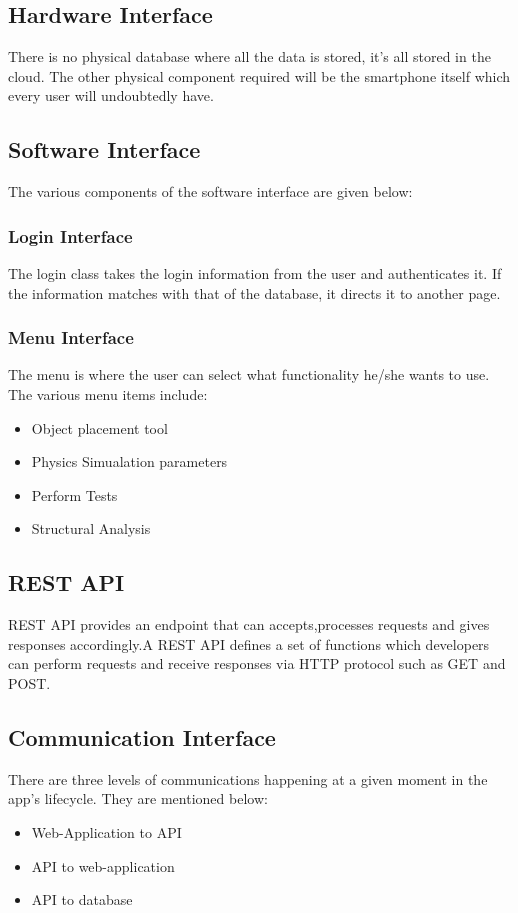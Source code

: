 \documentclass[BTech]{srmuthesis}
\begin{document}
\subsection{Hardware Interface}
There is no physical database where all the data is stored, it's all stored in the cloud. The other physical component required will be the smartphone itself which every user will undoubtedly have.
\subsection{Software Interface}
The various components of the software interface are given below:
\subsubsection{Login Interface}
The login class takes the login information from the user and authenticates it. If the information matches with that of the database, it directs it to another page.                          
\subsubsection{Menu Interface}
The menu is where the user can select what functionality he/she wants to use. The various menu items include:
\begin{itemize}
\item Object placement tool
\item Physics Simualation parameters
\item Perform Tests
\item Structural Analysis
\end{itemize}
\subsection{REST API}
REST API provides an endpoint that can accepts,processes requests and gives responses accordingly.A REST API defines a set of functions which developers can perform requests and receive responses via HTTP protocol such as GET and POST.
\subsection{Communication Interface}
There are three levels of communications happening at a given moment in the app's lifecycle. They are mentioned below:
\begin{itemize}
\item Web-Application to API
\item API to web-application
\item API to database
\end{itemize}
\end{document}
